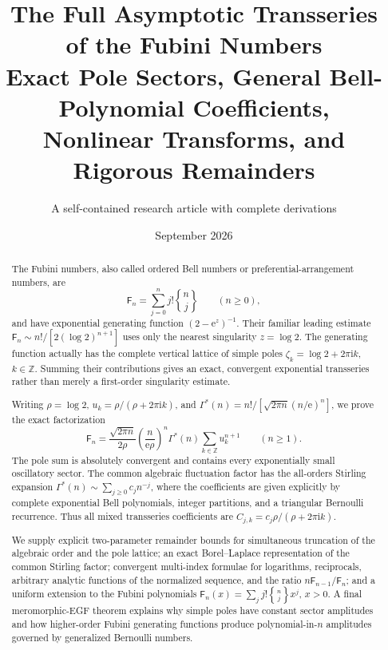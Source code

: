 \documentclass[11pt,a4paper,oneside]{article}
\title{\Huge\bfseries The Full Asymptotic Transseries\\[2mm]
       of the Fubini Numbers\\[3mm]
       \Large Exact Pole Sectors, General Bell-Polynomial Coefficients,\\
       Nonlinear Transforms, and Rigorous Remainders}
\author{A self-contained research article with complete derivations}
\date{September 2026}
\theoremstyle{definition}
\theoremstyle{remark}
\newcommand{\Fub}{\mathsf{F}}
\newcommand{\StirlingII}[2]{\genfrac\{\}{0pt}{}{#1}{#2}}
\newcommand{\e}{\mathrm{e}}
\newcommand{\ii}{\mathrm{i}}
\newcommand{\GammaStar}{\Gamma^{\!*}}
\begin{document}
\maketitle

\begin{abstract}
The Fubini numbers, also called ordered Bell numbers or preferential-arrangement
numbers, are
\[
  \Fub_n=\sum_{j=0}^{n}j!\StirlingII{n}{j}
  \qquad(n\geq 0),
\]
and have exponential generating function $(2-\e^z)^{-1}$.  Their familiar
leading estimate
\(
 \Fub_n\sim n!/[2(\log 2)^{n+1}]
\)
uses only the nearest singularity $z=\log 2$.  The generating function actually
has the complete vertical lattice of simple poles
\(
 \zeta_k=\log 2+2\pi\ii k
\), $k\in\mathbb Z$.  Summing their contributions gives an exact, convergent
exponential transseries rather than merely a first-order singularity estimate.

Writing $\rho=\log 2$, $u_k=\rho/(\rho+2\pi\ii k)$, and
\(
 \GammaStar(n)=n!/[\sqrt{2\pi n}(n/\e)^n]
\), we prove the exact factorization
\[
 \Fub_n=
 \frac{\sqrt{2\pi n}}{2\rho}
 \left(\frac{n}{\e\rho}\right)^n
 \GammaStar(n)\sum_{k\in\mathbb Z}u_k^{n+1}
 \qquad(n\geq1).
\]
The pole sum is absolutely convergent and contains every exponentially small
oscillatory sector.  The common algebraic fluctuation factor has the all-orders
Stirling expansion
\(
 \GammaStar(n)\sim\sum_{j\ge0}c_jn^{-j}
\), where the coefficients are given explicitly by complete exponential Bell
polynomials, integer partitions, and a triangular Bernoulli recurrence.  Thus
all mixed transseries coefficients are
\(
 C_{j,k}=c_j\rho/(\rho+2\pi\ii k)
\).

We supply explicit two-parameter remainder bounds for simultaneous truncation
of the algebraic order and the pole lattice; an exact Borel--Laplace
representation of the common Stirling factor; convergent multi-index formulae
for logarithms, reciprocals, arbitrary analytic functions of the normalized
sequence, and the ratio $n\Fub_{n-1}/\Fub_n$; and a uniform extension to the
Fubini polynomials
\(
 \Fub_n(x)=\sum_j j!\StirlingII{n}{j}x^j
\), $x>0$.  A final meromorphic-EGF theorem explains why simple poles have
constant sector amplitudes and how higher-order Fubini generating functions
produce polynomial-in-$n$ amplitudes governed by generalized Bernoulli
numbers.
\end{abstract}
\end{document}
